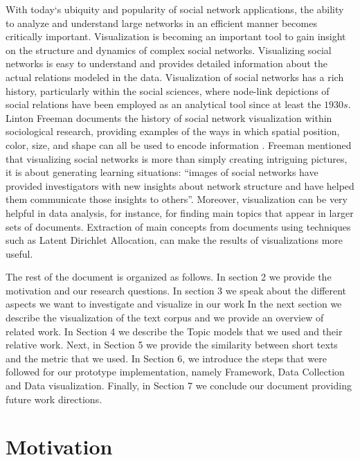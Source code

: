 With today‘s ubiquity and popularity of social network applications, the ability to analyze and understand large networks in an efficient manner becomes
critically important. Visualization is becoming an important tool to gain insight on the structure and dynamics of complex social networks. Visualizing social networks is easy to understand and provides detailed information
about the actual relations modeled in the data. Visualization of social networks has a rich history, particularly within the social sciences, where node-link depictions of social relations have been employed as an analytical tool since at least the $1930s$. Linton Freeman documents the history of social network visualization within sociological research, providing examples of the ways in which spatial position, color, size, and shape can all be used to encode information \cite{freeman}. Freeman mentioned that visualizing social networks
is more than simply creating intriguing pictures, it is about generating
learning situations: “images of social networks have provided investigators with new insights about network structure and have helped them communicate those
insights to others”. Moreover, visualization can be very helpful in data analysis, for instance, for finding main topics that appear in larger sets of documents. Extraction of main concepts from documents using techniques such as Latent Dirichlet Allocation, can make the results of visualizations more useful. 

The rest of the document is organized as follows. In section 2 we provide the motivation and our research questions. In section 3 we speak about the different aspects we want to investigate and visualize in our work
In the next section we describe the visualization of the text corpus and we provide an overview of related work. In Section 4 we describe the Topic models that we used and their relative work. Next, in Section 5 we provide the similarity between short texts and the metric that we used. In Section 6, we introduce the steps that were followed for our prototype implementation, namely Framework, Data Collection and Data visualization. Finally, in Section 7 we conclude our document providing future work directions.



\section{Motivation}



